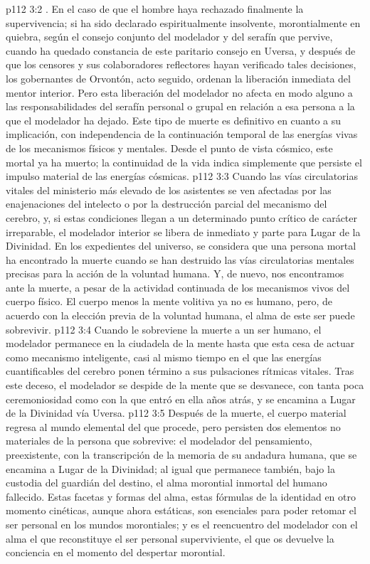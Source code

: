 \vs p112 3:2 . En el caso de que el hombre haya rechazado finalmente la supervivencia; si ha sido declarado espiritualmente insolvente, morontialmente en quiebra, según el consejo conjunto del modelador y del serafín que pervive, cuando ha quedado constancia de este paritario consejo en Uversa, y después de que los censores y sus colaboradores reflectores hayan verificado tales decisiones, los gobernantes de Orvontón, acto seguido, ordenan la liberación inmediata del mentor interior. Pero esta liberación del modelador no afecta en modo alguno a las responsabilidades del serafín personal o grupal en relación a esa persona a la que el modelador ha dejado. Este tipo de muerte es definitivo en cuanto a su implicación, con independencia de la continuación temporal de las energías vivas de los mecanismos físicos y mentales. Desde el punto de vista cósmico, este mortal ya ha muerto; la continuidad de la vida indica simplemente que persiste el impulso material de las energías cósmicas.
\vs p112 3:3 \pc {} Cuando las vías circulatorias vitales del ministerio más elevado de los asistentes se ven afectadas por las enajenaciones del intelecto o por la destrucción parcial del mecanismo del cerebro, y, si estas condiciones llegan a un determinado punto crítico de carácter irreparable, el modelador interior se libera de inmediato y parte para Lugar de la Divinidad. En los expedientes del universo, se considera que una persona mortal ha encontrado la muerte cuando se han destruido las vías circulatorias mentales precisas para la acción de la voluntad humana. Y, de nuevo, nos encontramos ante la muerte, a pesar de la actividad continuada de los mecanismos vivos del cuerpo físico. El cuerpo menos la mente volitiva ya no es humano, pero, de acuerdo con la elección previa de la voluntad humana, el alma de este ser puede sobrevivir.
\vs p112 3:4  Cuando le sobreviene la muerte a un ser humano, el modelador permanece en la ciudadela de la mente hasta que esta cesa de actuar como mecanismo inteligente, casi al mismo tiempo en el que las energías cuantificables del cerebro ponen término a sus pulsaciones rítmicas vitales. Tras este deceso, el modelador se despide de la mente que se desvanece, con tanta poca ceremoniosidad como con la que entró en ella años atrás, y se encamina a Lugar de la Divinidad vía Uversa.
\vs p112 3:5 \pc Después de la muerte, el cuerpo material regresa al mundo elemental del que procede, pero persisten dos elementos no materiales de la persona que sobrevive: el modelador del pensamiento, preexistente, con la transcripción de la memoria de su andadura humana, que se encamina a Lugar de la Divinidad; al igual que permanece también, bajo la custodia del guardián del destino, el alma morontial inmortal del humano fallecido. Estas facetas y formas del alma, estas fórmulas de la identidad en otro momento cinéticas, aunque ahora estáticas, son esenciales para poder retomar el ser personal en los mundos morontiales; y es el reencuentro del modelador con el alma el que reconstituye el ser personal superviviente, el que os devuelve la conciencia en el momento del despertar morontial.
